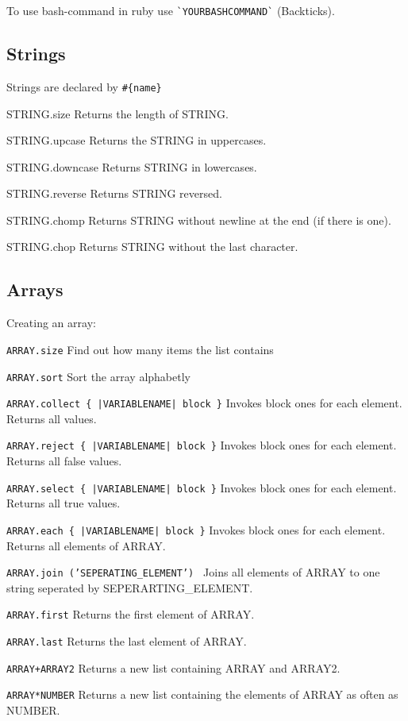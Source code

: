 \documentclass[10pt,a4paper]{scrartcl}
\begin{document}
To use bash-command in ruby use \texttt{\`{}YOURBASHCOMMAND\`} (Backticks).

\subsection{Strings}

Strings are declared by \verb$#{name}$

\begin{description}
	\item{STRING.size} Returns the length of STRING.
	\item{STRING.upcase} Returns the STRING in uppercases.
	\item{STRING.downcase} Returns STRING in lowercases.
	\item{STRING.reverse} Returns STRING reversed.
	\item{STRING.chomp} Returns STRING without newline at the end (if there is one).
	\item{STRING.chop} Returns STRING without the last character.
\end{description}

\subsection{Arrays}
Creating an array:

\begin{terminalcode}
\end{terminalcode}

\begin{description}
\item{\texttt{ARRAY.size}} Find out how many items the list contains
\item{\texttt{ARRAY.sort}} Sort the array alphabetly
\item{\texttt{ARRAY.collect \{ |VARIABLENAME| block \}}} Invokes block ones for each element. Returns all values.
\item{\texttt{ARRAY.reject \{ |VARIABLENAME| block \}}} Invokes block ones for each element. Returns all false values.
\item{\texttt{ARRAY.select \{ |VARIABLENAME| block \}}} Invokes block ones for each element. Returns all true values.
\item{\texttt{ARRAY.each \{ |VARIABLENAME| block \}}} Invokes block ones for each element. Returns all elements of ARRAY.
\item{\texttt{ARRAY.join ('SEPERATING\_ELEMENT')  }} Joins all elements of ARRAY to one string seperated by SEPERARTING\_ELEMENT.
\item{\texttt{ARRAY.first}} Returns the first element of ARRAY.
\item{\texttt{ARRAY.last}} Returns the last element of ARRAY.
\item{\texttt{ARRAY+ARRAY2}} Returns a new list containing ARRAY and ARRAY2.
\item{\texttt{ARRAY*NUMBER}} Returns a new list containing the elements of ARRAY as often as NUMBER.
\end{description}
\end{document}
